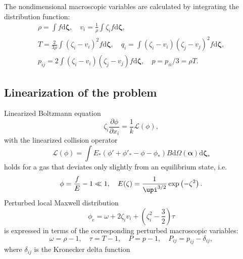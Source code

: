 \documentclass[]{jfm}
\newcommand{\dd}{\mathrm{d}}
\newcommand{\pder}[2][]{\frac{\partial#1}{\partial#2}}
\newcommand{\dzeta}{\boldsymbol{\dd\zeta}}
\begin{document}
The nondimensional macroscopic variables are calculated by integrating the distribution function:
\begin{equation}\label{eq:macro}
    \begin{gathered}
    \rho = \int f \dzeta, \quad
    v_i = \frac1{\rho} \int \zeta_i f \dzeta, \\
    T = \frac{2}{3\rho}\int(\zeta_i-v_i)^2 f \dzeta, \quad
    q_i = \int(\zeta_i-v_i)(\zeta_j-v_j)^2 f \dzeta, \\
    p_{ij} = 2 \int(\zeta_i-v_i)(\zeta_j-v_j) f \dzeta,
        \quad p = p_{ii}/3 = \rho T.
    \end{gathered}
\end{equation}

\subsection{Linearization of the problem}

Linearized Boltzmann equation
\begin{equation}\label{eq:linear_Boltzmann}
    \zeta_i \pder[\phi]{x_i} = \frac1k \mathcal{L}(\phi),
\end{equation}
with the linearized collision operator
\begin{equation}\label{eq:linear_ci}
    \mathcal{L}(\phi) = \int E_*(\phi'+\phi'_*-\phi-\phi_*) B
    \dd \Omega(\boldsymbol{\alpha}) \dzeta_*
\end{equation}
holds for a gas that deviates only slightly from an equilibrium state, i.e.
\begin{equation}\label{eq:linear_condition}
    \phi = \frac{f}{E} - 1 \ll 1, \quad E(\zeta) = \frac1{\upi^{3/2}}\exp\left(-\zeta^2\right).
\end{equation}
Perturbed local Maxwell distribution
\begin{equation}\label{eq:linear_maxwellian}
    \phi_e = \omega + 2\zeta_i v_i + \left(\zeta_i^2-\frac32\right)\tau
\end{equation}
is expressed in terms of the corresponding perturbed macroscopic variables:
\begin{equation}
    \omega = \rho-1, \quad \tau = T-1, \quad P = p-1, \quad P_{ij} = p_{ij}-\delta_{ij},
\end{equation}
where \(\delta_{ij}\) is the Kronecker delta function
\end{document}
